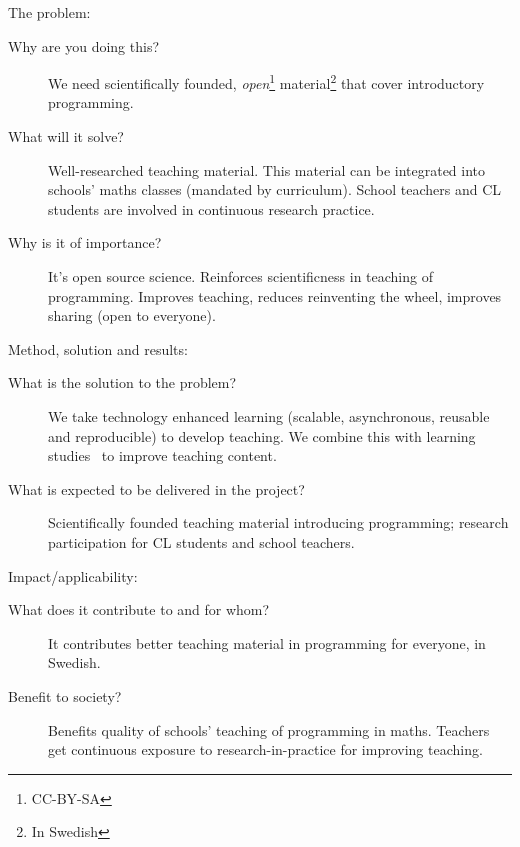 The problem:
\begin{description}
  \item[Why are you doing this?]
    We need scientifically founded, \emph{open}\footnote{CC-BY-SA} 
    material\footnote{In Swedish} that cover introductory programming.

  \item[What will it solve?]
    Well-researched teaching material.
    This material can be integrated into schools’ maths classes (mandated by 
    curriculum).
    School teachers and CL students are involved in continuous research 
    practice.

  \item[Why is it of importance?]
    It's open source science.
    Reinforces scientificness in teaching of programming.
    Improves teaching, reduces reinventing the wheel, improves sharing (open to 
    everyone).
\end{description}

Method, solution and results:
\begin{description}
  \item[What is the solution to the problem?]
    We take technology enhanced learning (scalable, asynchronous, reusable and 
    reproducible) to develop teaching.
    We combine this with learning studies~\parencite{LearningStudy} to improve 
    teaching content.

  \item[What is expected to be delivered in the project?]
    Scientifically founded teaching material introducing programming;
    research participation for CL students and school teachers.
\end{description}

Impact/applicability:
\begin{description}
  \item[What does it contribute to and for whom?]
    It contributes better teaching material in programming for everyone, in 
    Swedish.

  \item[Benefit to society?]
    Benefits quality of schools' teaching of programming in maths.
    Teachers get continuous exposure to research-in-practice for improving 
    teaching.
\end{description}

